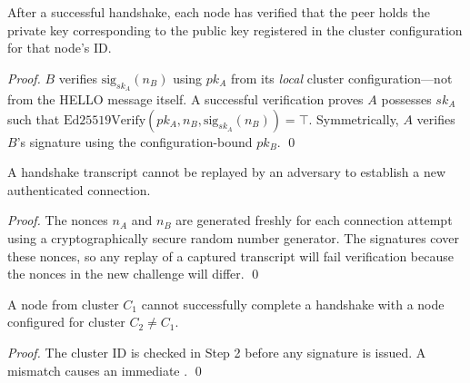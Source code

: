 \begin{theorem}
\label{thm:mutual-auth}
After a successful handshake, each node has verified that the peer holds the
private key corresponding to the public key registered in the cluster
configuration for that node's ID.
\end{theorem}

\begin{proof}
$B$ verifies $\mathrm{sig}_{sk_A}(n_B)$ using $pk_A$ from its \emph{local}
cluster configuration---not from the HELLO message itself. A successful
verification proves $A$ possesses $sk_A$ such that
$\mathrm{Ed25519Verify}(pk_A, n_B, \mathrm{sig}_{sk_A}(n_B)) = \top$.
Symmetrically, $A$ verifies $B$'s signature using the configuration-bound
$pk_B$. \qed
\end{proof}

\begin{theorem}
\label{thm:replay}
A handshake transcript cannot be replayed by an adversary to establish a new
authenticated connection.
\end{theorem}

\begin{proof}
The nonces $n_A$ and $n_B$ are generated freshly for each connection attempt
using a cryptographically secure random number generator. The signatures cover
these nonces, so any replay of a captured transcript will fail verification
because the nonces in the new challenge will differ. \qed
\end{proof}

\begin{theorem}
\label{thm:cluster-binding}
A node from cluster $C_1$ cannot successfully complete a handshake with a node
configured for cluster $C_2 \neq C_1$.
\end{theorem}

\begin{proof}
The cluster ID is checked in Step 2 before any signature is issued. A mismatch
causes an immediate . \qed
\end{proof}
